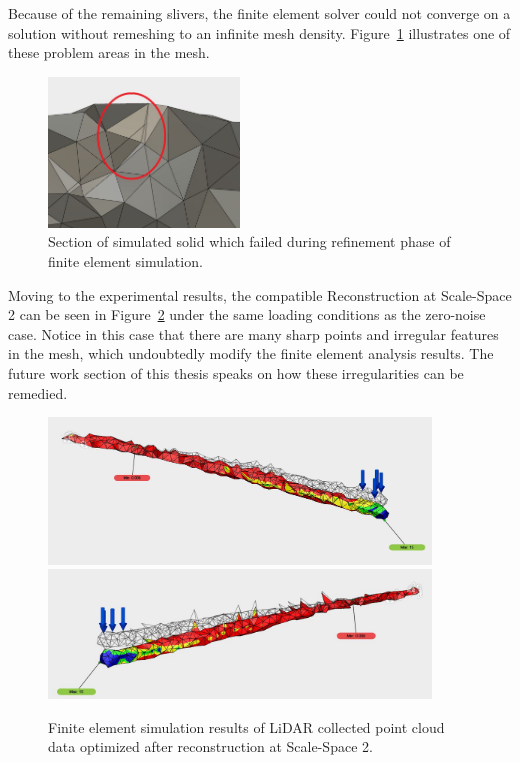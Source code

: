 \documentclass[12pt]{drexelthesis}
\begin{document}
Because of the remaining slivers, the finite element solver could not converge on a solution without remeshing to an infinite mesh density. Figure~\ref{conc:gnoiseproblem} illustrates one of these problem areas in the mesh.

\begin{figure}[!ht]
	\centering
		\includegraphics[width=2in]{conclusion/noiseSS2BoundedProblem.jpg}
		\caption[Failure section of noise induced solid volume]{\centering Section of simulated solid which failed during refinement phase of finite element simulation.}
	\label{conc:gnoiseproblem}
\end{figure}

Moving to the experimental results, the compatible Reconstruction at Scale-Space 2 can be seen in Figure~\ref{conc:realSS2FEresult} under the same loading conditions as the zero-noise case. Notice in this case that there are many sharp points and irregular features in the mesh, which undoubtedly modify the finite element analysis results. The future work section of this thesis speaks on how these irregularities can be remedied.

\begin{figure}[!ht]
	\centering
		\includegraphics[width=4in]{conclusion/realSS2FEresult.jpg}
		\includegraphics[width=4in]{conclusion/realSS2FEresult01.jpg}
		\caption[Finite element simulation of LiDAR collected point cloud data]{\centering Finite element simulation results of LiDAR collected point cloud data optimized after reconstruction at Scale-Space 2.}
		\label{conc:realSS2FEresult}
\end{figure}
\end{document}
